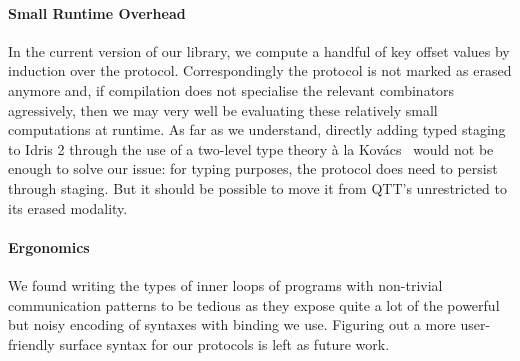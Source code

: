 \documentclass{easychair}
\begin{document}
\paragraph{Small Runtime Overhead}
In the current version of our library, we compute a handful
of key offset values by induction over the protocol. Correspondingly
the protocol is not marked as erased anymore and, if compilation does
not specialise the relevant combinators agressively, then we may very
well be evaluating these relatively small computations at runtime.
%
As far as we understand, directly adding typed staging to Idris 2
through the use of a two-level type theory à la
Kov{\'{a}}cs~\cite{DBLP:journals/pacmpl/Kovacs22} would not be
enough to solve our issue: for typing purposes, the protocol does need
to persist through staging. But it should be possible to move it
from QTT's unrestricted to its erased modality.

\paragraph{Ergonomics}
We found writing the types of inner loops of programs with non-trivial
communication patterns to be tedious as they expose quite a lot of the
powerful but noisy encoding of syntaxes with binding we use.
Figuring out a more user-friendly surface syntax for our protocols is
left as future work.





\newpage

%
%
%

\end{document}
